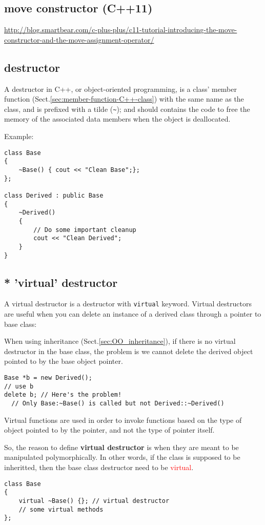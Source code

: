 \subsection{move constructor (C++11)}
\label{sec:move-constructor-C++11}

\url{http://blog.smartbear.com/c-plus-plus/c11-tutorial-introducing-the-move-constructor-and-the-move-assignment-operator/}

\subsection{destructor}
\label{sec:OO_destructor}

A destructor in C++, or object-oriented programming, is a class' member function
(Sect.\ref{sec:member-function-C++-class}) with the same name as the class,
and is prefixed with a tilde (\verb!~!); and should contains the code to free
the memory of the associated data members when the object is deallocated.

Example:
\begin{verbatim}
class Base 
{
    ~Base() { cout << "Clean Base";};
};

class Derived : public Base
{
    ~Derived()
    {
        // Do some important cleanup
        cout << "Clean Derived";
    }
}
\end{verbatim}

\subsection{* 'virtual' destructor}
\label{sec:OO_virtual-destructor}
\label{sec:virtual-destructor}

A virtual destructor is a destructor with \verb!virtual! keyword.
Virtual destructors are useful when you can delete an instance of a derived
class through a pointer to base class:

When using inheritance (Sect.\ref{sec:OO_inheritance}), if there is no
virtual destructor in the base class, the problem is we cannot delete the
derived object pointed to by the base object pointer.
\begin{verbatim}
Base *b = new Derived();
// use b
delete b; // Here's the problem! 
  // Only Base:~Base() is called but not Derived::~Derived()
\end{verbatim}
Virtual functions are used in order to invoke functions based on the type of
object pointed to by the pointer, and not the type of pointer itself.

So, the reason to define {\bf virtual destructor} is when they are meant to be
manipulated polymorphically. In other words, if the class is supposed to be
inheritted, then the base class destructor need to be \textcolor{red}{virtual}.
\begin{verbatim}
class Base 
{
    virtual ~Base() {}; // virtual destructor
    // some virtual methods
};

\end{verbatim}

